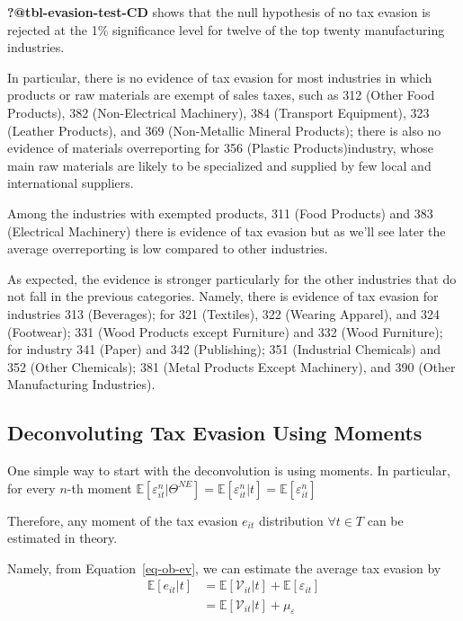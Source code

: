 \documentclass[
  12pt]{article}
\theoremstyle{definition}
\theoremstyle{remark}
\begin{document}
\textbf{?@tbl-evasion-test-CD} shows that the null hypothesis of no tax
evasion is rejected at the 1\% significance level for twelve of the top
twenty manufacturing industries.

In particular, there is no evidence of tax evasion for most industries
in which products or raw materials are exempt of sales taxes, such as
312 (Other Food Products), 382 (Non-Electrical Machinery), 384
(Transport Equipment), 323 (Leather Products), and 369 (Non-Metallic
Mineral Products); there is also no evidence of materials overreporting
for 356 (Plastic Products)industry, whose main raw materials are likely
to be specialized and supplied by few local and international suppliers.

Among the industries with exempted products, 311 (Food Products) and 383
(Electrical Machinery) there is evidence of tax evasion but as we'll see
later the average overreporting is low compared to other industries.

As expected, the evidence is stronger particularly for the other
industries that do not fall in the previous categories. Namely, there is
evidence of tax evasion for industries 313 (Beverages); for 321
(Textiles), 322 (Wearing Apparel), and 324 (Footwear); 331 (Wood
Products except Furniture) and 332 (Wood Furniture); for industry 341
(Paper) and 342 (Publishing); 351 (Industrial Chemicals) and 352 (Other
Chemicals); 381 (Metal Products Except Machinery), and 390 (Other
Manufacturing Industries).

\subsection{Deconvoluting Tax Evasion Using
Moments}\label{deconvoluting-tax-evasion-using-moments}

One simple way to start with the deconvolution is using moments. In
particular, for every \(n\)-th moment
\(\mathbb{E}[\varepsilon_{it}^n|\Theta^{NE}]=\mathbb{E}[\varepsilon_{it}^n|t]=\mathbb{E}[\varepsilon_{it}^n]\)

Therefore, any moment of the tax evasion \(e_{it}\) distribution
\(\forall t\in T\) can be estimated in theory.

Namely, from Equation~\ref{eq-ob-ev}, we can estimate the average tax
evasion by \[
\begin{aligned}
  \mathbb{E}[e_{it}|t]&=\mathbb{E}[\mathcal V_{it}|t]+\mathbb{E}[\varepsilon_{it}]\\
  &=\mathbb{E}[\mathcal V_{it}|t]+\mu_{\varepsilon}
\end{aligned}
\]
\end{document}
